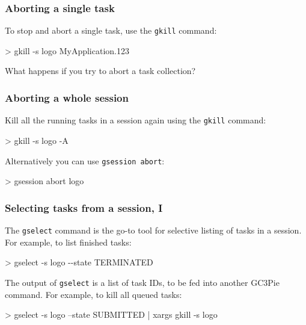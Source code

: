 \documentclass[english,serif,mathserif,usenames,dvipsnames]{beamer}
\begin{document}
\begin{frame}
  \frametitle{Aborting a single task}

  To stop and abort a single task, use the \texttt{gkill} command:
\begin{semiverbatim}
    > gkill -s logo MyApplication.123
\end{semiverbatim}

  \pause
  \begin{exercise*}
    What happens if you try to abort a task collection?
  \end{exercise*}
\end{frame}

\begin{frame}
  \frametitle{Aborting a whole session}

  \alert{Kill all the running tasks} in a session again using the
  \texttt{gkill} command:
\begin{semiverbatim}
    > gkill -s logo -A
\end{semiverbatim}

  Alternatively you can use \texttt{gsession abort}:
\begin{semiverbatim}
    > gsession abort logo
\end{semiverbatim}
\end{frame}


\begin{frame}[fragile]
  \frametitle{Selecting tasks from a session, I}

  The \texttt{gselect} command is the go-to tool for selective listing
  of tasks in a session.  For example, to list finished tasks:
\begin{semiverbatim}
    > gselect -s logo -{}-state TERMINATED
\end{semiverbatim}

  \+ The output of \texttt{gselect} is a list of task IDs, to be fed
  into another GC3Pie command.  For example, to kill all queued tasks:
  \begin{stdout}
    > gselect -s logo --state SUBMITTED | xargs gkill -s logo
  \end{stdout}
\end{frame}
\end{document}
